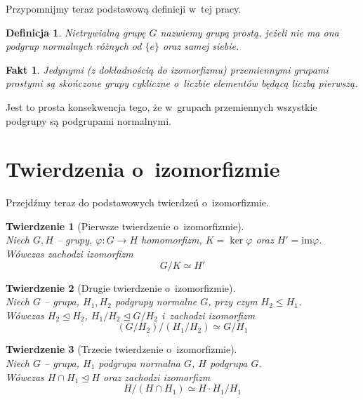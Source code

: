 \documentclass[licencjacka]{pracamgr}
\newtheorem{deff}{Definicja}[section]
\newtheorem{thh}{Twierdzenie}[section]
\newtheorem{fact}{Fakt}[section]
\begin{document}
Przypomnijmy teraz podstawową definicji w~tej pracy.
\begin{deff}
	Nietrywialną grupę $G$ nazwiemy \emph{grupą prostą}, jeżeli nie ma ona podgrup normalnych różnych od $\{e\}$ oraz samej siebie.
\end{deff}
\begin{fact}
	Jedynymi (z dokładnością do izomorfizmu) przemiennymi grupami prostymi są skończone grupy cykliczne o~liczbie elementów będącą liczbą pierwszą.
\end{fact}
Jest to prosta konsekwencja tego, że w~grupach przemiennych wszystkie podgrupy są podgrupami normalnymi.


\section{Twierdzenia o~izomorfizmie}
Przejdźmy teraz do podstawowych twierdzeń o~izomorfizmie.
\begin{thh}[Pierwsze twierdzenie o~izomorfizmie] $ $ \\
	Niech $G, H$ -- grupy, 	$ \varphi \colon G \to H$ homomorfizm, $K = \ker{\varphi}$ oraz $H' = \mathrm{im}\varphi $. \\
	Wówczas zachodzi izomorfizm $$G/K \simeq H'$$
\end{thh}
\begin{thh}[Drugie twierdzenie o~izomorfizmie]$ $\\
	Niech $G$ -- grupa, 	$H_1, H_2$ podgrupy normalne $G$, przy czym $H_2 \leq H_1$. \\
	Wówczas $H_2 \trianglelefteq H_2$, $H_1/H_2 \trianglelefteq G/H_2$ i~zachodzi izomorfizm
	$$ (G/H_2) / (H_1/H_2) \simeq G/H_1$$
\end{thh}
\begin{thh}[Trzecie twierdzenie o~izomorfizmie] $ $ \\
	Niech $G$ -- grupa, $H_1$ podgrupa normalna $G$, $H$ podgrupa $G$. \\
	Wówczas $H\cap H_1 \trianglelefteq H$ oraz zachodzi izomorfizm
	$$ H/(H\cap H_1) \simeq H \cdot H_1 / H_1 $$
\end{thh}
\end{document}
